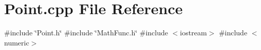 \section{Point.\+cpp File Reference}
\label{_point_8cpp}
{\ttfamily \#include \char`\"{}Point.\+h\char`\"{}}\newline
{\ttfamily \#include \char`\"{}Math\+Func.\+h\char`\"{}}\newline
{\ttfamily \#include $<$iostream$>$}\newline
{\ttfamily \#include $<$numeric$>$}\newline
